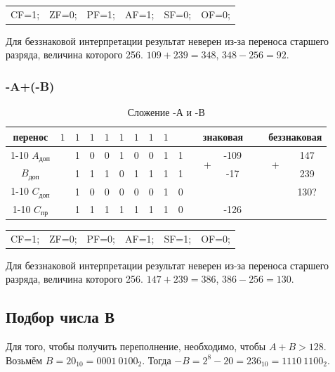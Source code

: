\begin{table}[H]
    \centering
    \begin{tabular}{cccccc}
        CF=1; & ZF=0; & PF=1; & AF=1; & SF=0; & OF=0;
    \end{tabular}
\end{table}

Для беззнаковой интерпретации результат неверен из-за переноса старшего разряда,
величина которого 256. $109+239=348$, $348-256=92$. 


\subsubsection{-A+(-B)}

\begin{table}[H]
    \centering
    \caption{Сложение -А и -В}
    \begin{tabular}{c|cc|cccccccp{1cm}ccp{0.5cm}cc}
		\small перенос & $1$ & $1$ & $1$ & $1$ & $1$ & $1$ & $1$ & $1$ & & & \multicolumn{2}{c}{знаковая} & \  & \multicolumn{2}{c}{беззнаковая}  \\
		\cline{1-10} \cline{12-13} \cline{15-16}
		$A_{\text{доп}}$ & & 1 & 0 & 0 & 1 & 0 & 0 & 1 & 1 & & \multirow{2}{*}{+} & -109 & \  & \multirow{2}{*}{+} & 147\\
		$B_{\text{доп}}$ & & 1 & 1 & 1 & 0 & 1 & 1 & 1 & 1 & & & -17 & \  &  & 239 \\
		\cline{1-10} \cline{12-13} \cline{15-16}
		$C_{\text{доп}}$ & & 1 & 0 & 0 & 0 & 0 & 0 & 1 & 0 & & & & \  &  & 130? \\
		\cline{1-10} \cline{12-13} \cline{15-16}
		$C_{\text{пр}}$ & & 1 & 1 & 1 & 1 & 1 & 1 & 1 & 0 & & & -126 & \  &  & \\
    \end{tabular}
\end{table}

\begin{table}[H]
    \centering
    \begin{tabular}{cccccc}
        CF=1; & ZF=0; & PF=0; & AF=1; & SF=1; & OF=0;
    \end{tabular}
\end{table}

Для беззнаковой интерпретации результат неверен из-за переноса старшего разряда,
величина которого 256. $147+239=386$, $386-256=130$. 

\subsection{Подбор числа В}
Для того, чтобы получить переполнение, необходимо, чтобы $A+B>128$. Возьмём
$B=20_{10}=0001\ 0100_{2}$. Тогда $-B=2^8-20=236_{10}=1110\ 1100_{2}$.

